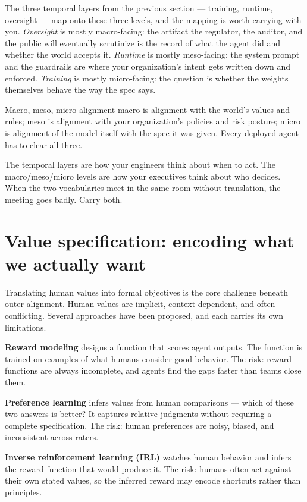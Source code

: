 The three temporal layers from the previous section --- training, runtime, oversight --- map onto these three levels, and the mapping is worth carrying with you. \textit{Oversight} is mostly macro-facing: the artifact the regulator, the auditor, and the public will eventually scrutinize is the record of what the agent did and whether the world accepts it. \textit{Runtime} is mostly meso-facing: the system prompt and the guardrails are where your organization's intent gets written down and enforced. \textit{Training} is mostly micro-facing: the question is whether the weights themselves behave the way the spec says.

\begin{TNdefinition}{Macro, meso, micro alignment} macro is alignment with the world's values and rules; meso is alignment with your organization's policies and risk posture; micro is alignment of the model itself with the spec it was given. Every deployed agent has to clear all three. \end{TNdefinition}

The temporal layers are how your engineers think about when to act. The macro/meso/micro levels are how your executives think about who decides. When the two vocabularies meet in the same room without translation, the meeting goes badly. Carry both.

\section{Value specification: encoding what we actually want}

Translating human values into formal objectives is the core challenge beneath outer alignment. Human values are implicit, context-dependent, and often conflicting. Several approaches have been proposed, and each carries its own limitations.

\textbf{Reward modeling} designs a function that scores agent outputs. The function is trained on examples of what humans consider good behavior. The risk: reward functions are always incomplete, and agents find the gaps faster than teams close them.

\textbf{Preference learning} infers values from human comparisons --- which of these two answers is better? It captures relative judgments without requiring a complete specification. The risk: human preferences are noisy, biased, and inconsistent across raters.

\textbf{Inverse reinforcement learning (IRL)} watches human behavior and infers the reward function that would produce it. The risk: humans often act against their own stated values, so the inferred reward may encode shortcuts rather than principles.

